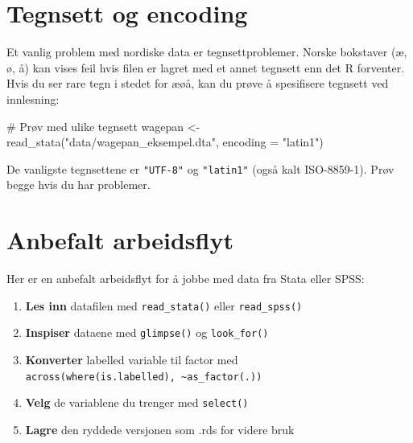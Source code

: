 \documentclass[
  norsk,
  letterpaper,
  DIV=11,
  numbers=noendperiod]{scrreprt}
\newenvironment{Shaded}{\begin{snugshade}}{\end{snugshade}}
\newcommand{\AttributeTok}[1]{\textcolor[rgb]{0.40,0.45,0.13}{#1}}
\newcommand{\CommentTok}[1]{\textcolor[rgb]{0.37,0.37,0.37}{#1}}
\newcommand{\FunctionTok}[1]{\textcolor[rgb]{0.28,0.35,0.67}{#1}}
\newcommand{\NormalTok}[1]{\textcolor[rgb]{0.00,0.23,0.31}{#1}}
\newcommand{\OtherTok}[1]{\textcolor[rgb]{0.00,0.23,0.31}{#1}}
\newcommand{\StringTok}[1]{\textcolor[rgb]{0.13,0.47,0.30}{#1}}
\providecommand{\tightlist}{%
  \setlength{\itemsep}{0pt}\setlength{\parskip}{0pt}}
\theoremstyle{definition}
\theoremstyle{remark}
\begin{document}
\section{Tegnsett og encoding}\label{tegnsett-og-encoding}

Et vanlig problem med nordiske data er tegnsettproblemer. Norske
bokstaver (æ, ø, å) kan vises feil hvis filen er lagret med et annet
tegnsett enn det R forventer. Hvis du ser rare tegn i stedet for æøå,
kan du prøve å spesifisere tegnsett ved innlesning:

\begin{Shaded}
\begin{Highlighting}[]
\CommentTok{\# Prøv med ulike tegnsett}
\NormalTok{wagepan }\OtherTok{\textless{}{-}} \FunctionTok{read\_stata}\NormalTok{(}\StringTok{"data/wagepan\_eksempel.dta"}\NormalTok{, }\AttributeTok{encoding =} \StringTok{"latin1"}\NormalTok{)}
\end{Highlighting}
\end{Shaded}

De vanligste tegnsettene er \texttt{"UTF-8"} og \texttt{"latin1"} (også
kalt ISO-8859-1). Prøv begge hvis du har problemer.

\section{Anbefalt arbeidsflyt}\label{anbefalt-arbeidsflyt}

Her er en anbefalt arbeidsflyt for å jobbe med data fra Stata eller
SPSS:

\begin{enumerate}
\def\labelenumi{\arabic{enumi}.}
\tightlist
\item
  \textbf{Les inn} datafilen med \texttt{read\_stata()} eller
  \texttt{read\_spss()}
\item
  \textbf{Inspiser} dataene med \texttt{glimpse()} og
  \texttt{look\_for()}
\item
  \textbf{Konverter} labelled variable til factor med
  \texttt{across(where(is.labelled),\ \textasciitilde{}as\_factor(.))}
\item
  \textbf{Velg} de variablene du trenger med \texttt{select()}
\item
  \textbf{Lagre} den ryddede versjonen som .rds for videre bruk
\end{enumerate}
\end{document}
